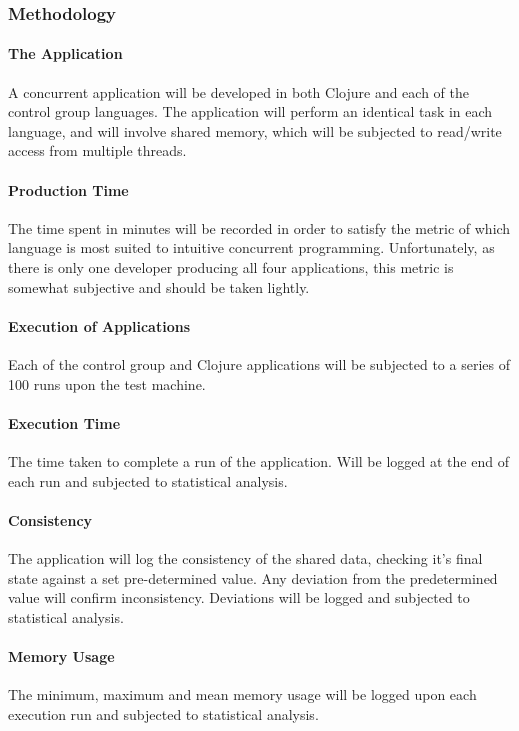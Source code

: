 \documentclass[12pt,a4paper]{article}
\begin{document}
\subsubsection{Methodology}

\paragraph{The Application}
A concurrent application will be developed in both Clojure and each of the control group languages. The application will perform an identical task in each language, and will involve shared memory, which will be subjected to read/write access from multiple threads.

\paragraph{Production Time}

The time spent in minutes will be recorded in order to satisfy the metric of which language is most suited to intuitive concurrent programming. Unfortunately, as there is only one developer producing all four applications, this metric is somewhat subjective and should be taken lightly. 

\paragraph{Execution of Applications}
Each of the control group and Clojure applications will be subjected to a series of 100 runs upon the test machine. 

\paragraph{Execution Time}
The time taken to complete a run of the application. Will be logged at the end of each run and subjected to statistical analysis.

\paragraph{Consistency}
The application will log the consistency of the shared data, checking it's final state against a set pre-determined value. Any deviation from the predetermined value will confirm inconsistency. Deviations will be logged and subjected to statistical analysis.

\paragraph{Memory Usage}
The minimum, maximum and mean memory usage will be logged upon each execution run and subjected to statistical analysis.
\end{document}
